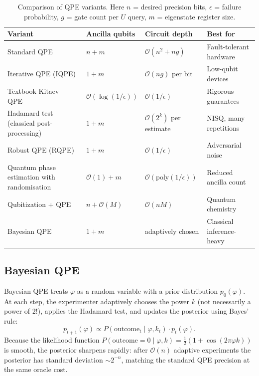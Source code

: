 \documentclass[12pt,a4paper]{article}
\newcommand{\bigO}{\mathcal{O}}
\begin{document}
\begin{table}[ht]
\centering
\caption{Comparison of QPE variants.  Here $n$ = desired precision bits,
  $\epsilon$ = failure probability, $g$ = gate count per $U$ query,
  $m$ = eigenstate register size.}
\renewcommand{\arraystretch}{1.4}
\begin{tabular}{@{}p{3.5cm}p{3cm}p{3cm}p{4cm}@{}}
\toprule
\textbf{Variant} & \textbf{Ancilla qubits} & \textbf{Circuit depth} & \textbf{Best for} \\
\midrule
Standard QPE~\cite{nielsen2010} & $n+m$ & $\bigO(n^2 + ng)$ & Fault-tolerant hardware \\
\addlinespace
Iterative QPE (IQPE)~\cite{kitaev1995} & $1+m$ & $\bigO(ng)$ per bit & Low-qubit devices \\
\addlinespace
Textbook Kitaev QPE~\cite{kitaev1995} & $\bigO(\log(1/\epsilon))$ & $\bigO(1/\epsilon)$ & Rigorous guarantees \\
\addlinespace
Hadamard test (classical post-processing) & $1+m$ & $\bigO(2^k)$ per estimate & NISQ, many repetitions \\
\addlinespace
Robust QPE (RQPE)~\cite{kimmel2015} & $1+m$ & $\bigO(1/\epsilon)$ & Adversarial noise \\
\addlinespace
Quantum phase estimation with randomisation~\cite{svore2013} & $\bigO(1)+m$ & $\bigO(\text{poly}(1/\epsilon))$ & Reduced ancilla count \\
\addlinespace
Qubitization + QPE~\cite{babbush2019} & $n + \bigO(M)$ & $\bigO(nM)$ & Quantum chemistry \\
\addlinespace
Bayesian QPE~\cite{wiebe2016} & $1+m$ & adaptively chosen & Classical inference-heavy \\
\bottomrule
\end{tabular}
\label{tab:variants}
\end{table}

\subsection{Bayesian QPE}

Bayesian QPE treats $\varphi$ as a random variable with a prior distribution
$p_0(\varphi)$.  At each step, the experimenter adaptively chooses the power
$k$ (not necessarily a power of 2!), applies the Hadamard test, and updates
the posterior using Bayes' rule:
\[
  p_{t+1}(\varphi) \propto
  P(\text{outcome}_t \mid \varphi, k_t)\cdot p_t(\varphi).
\]
Because the likelihood function
$P(\text{outcome}=0\mid\varphi,k) = \tfrac{1}{2}(1+\cos(2\pi\varphi k))$
is smooth, the posterior sharpens rapidly: after $\bigO(n)$ adaptive
experiments the posterior has standard deviation $\sim 2^{-n}$, matching
the standard QPE precision at the same oracle cost.
\end{document}
